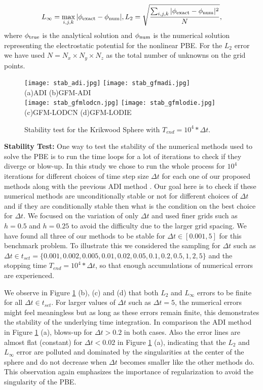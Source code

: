 \begin{equation}
	L_\infty=\max\limits_{i,j,k}|\phi_{\rm exact}-\phi_{\rm num}|, L_2 = \sqrt{\frac{\sum_{i,j,k}|\phi_{\rm exact}-\phi_{\rm num}|^2}{N}},\label{eq:l2lmax}
\end{equation}
where $\phi_{\rm true}$ is the analytical solution and $\phi_{\rm num}$ is the numerical solution representing the electrostatic potential for the nonlinear PBE. For the $L_2$ error we have used $N= N_x \times N_y \times N_z$ as the total number of unknowns on the grid points. 
\begin{figure}[!ht]
	\centering
	\texttt{[image: stab\_adi.jpg]}
	\texttt{[image: stab\_gfmadi.jpg]}\\
	(a)ADI\hspace*{2.5in} (b)GFM-ADI\\ 	
	\texttt{[image: stab\_gfmlodcn.jpg]}
	\texttt{[image: stab\_gfmlodie.jpg]}\\
	(c)GFM-LODCN \hspace*{2in} (d)GFM-LODIE
	\caption{Stability test for the Krikwood Sphere with $T_{end}= 10^4*\Delta t$.}
	\label{fig:stab_krik}	
\end{figure}

\textbf{Stability Test:} One way to test the stability of the numerical methods used to solve the PBE is to run the time loops for a lot of iterations to check if they diverge or blow-up. In this study we chose to run the whole process for $10^4$ iterations for different choices of time step size $\Delta t$ for each one of our proposed  methods along with the previous ADI method \cite{Geng2013_Fully}. Our goal here is to check if these numerical methods are unconditionally stable or not for different choices of $\Delta t$ and if they are conditionally stable then what is the condition on the best choice for $\Delta t$. We focused on the variation of only $\Delta t$ and used finer grids such as $h = 0.5$ and $h = 0.25$ to avoid the difficulty due to the larger grid spacing. We have found all three of our methods to be stable for $\Delta t \in [0.001,5]$ for this benchmark problem. To illustrate this we considered the sampling for $\Delta t $ such as $\Delta t \in t_{set}=\{0.001, 0.002, 0.005,0.01, 0.02, 0.05, 0.1, 0.2, 0.5, 1,2,5\}$ and the stopping time $T_{end}= 10^4*\Delta t$, so that enough accumulations of numerical errors are experienced. 

We observe in Figure \ref{fig:stab_krik} (b), (c) and (d) that both $L_2$ and $L_\infty$ errors to be finite for all $\Delta t \in t_{set}$. For larger values of $\Delta t$ such as $\Delta t =5$, the numerical errors might feel meaningless but as long as these errors remain finite, this demonstrates the stability of the underlying time integration.  In comparison the ADI method \cite{Geng2013_Fully} in Figure \ref{fig:stab_krik} (a), blows-up for $\Delta t > 0.2$ in both cases. Also the error lines are almost flat (constant) for $\Delta t <0.02$ in Figure \ref{fig:stab_krik} (a), indicating that the $L_2$ and $L_\infty$ error are polluted and dominated by the singularities at the center of the sphere and do not decrease when $\Delta t$ becomes smaller like the other methods do. This observation again emphasizes the importance of regularization to avoid the singularity of the PBE. 


